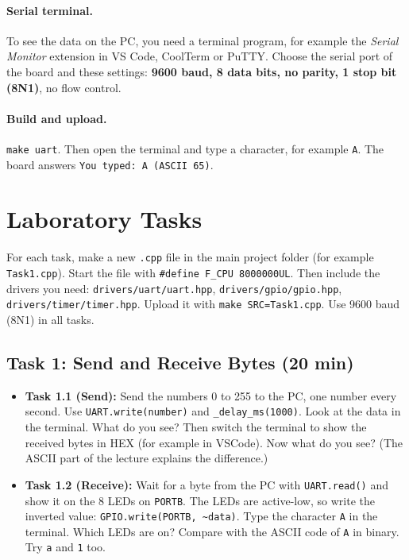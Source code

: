 \documentclass[11pt,a4paper]{article}
\newcommand{\code}[1]{\texttt{#1}}
\begin{document}
\paragraph{Serial terminal.} To see the data on the PC, you need a terminal
program, for example the \emph{Serial Monitor} extension in VS Code, CoolTerm
or PuTTY. Choose the serial port of the board and these settings:
\textbf{9600 baud, 8 data bits, no parity, 1 stop bit (8N1)}, no flow control.

\paragraph{Build and upload.} \code{make uart}. Then open the terminal and type
a character, for example \code{A}. The board answers
\code{You typed: A  (ASCII 65)}.



\newpage
\section{Laboratory Tasks}
\setlength{\parindent}{0pt}\setlength{\parskip}{5pt}

For each task, make a new \code{.cpp} file in the main project folder (for
example \code{Task1.cpp}). Start the file with \code{\#define F\_CPU 8000000UL}.
Then include the drivers you need: \code{drivers/uart/uart.hpp},
\code{drivers/gpio/gpio.hpp}, \code{drivers/timer/timer.hpp}. Upload it with
\code{make SRC=Task1.cpp}. Use 9600 baud (8N1) in all tasks.

\subsection*{Task 1: Send and Receive Bytes (20 min)}
\begin{itemize}
  \item \textbf{Task 1.1 (Send):} Send the numbers 0 to 255 to the PC, one number
        every second. Use \code{UART.write(number)} and \code{\_delay\_ms(1000)}.
        Look at the data in the terminal. What do you see? Then switch the
        terminal to show the received bytes in HEX (for example in VSCode).
        Now what do you see? (The ASCII part of the lecture explains the difference.)
  \item \textbf{Task 1.2 (Receive):} Wait for a byte from the PC with
        \code{UART.read()} and show it on the 8 LEDs on \code{PORTB}. The LEDs are
        active-low, so write the inverted value:
        \mbox{\code{GPIO.write(PORTB, \textasciitilde data)}}. Type the character \code{A}
        in the terminal. Which LEDs are on? Compare with the ASCII code of \code{A}
        in binary. Try \code{a} and \code{1} too.
\end{itemize}
\end{document}
